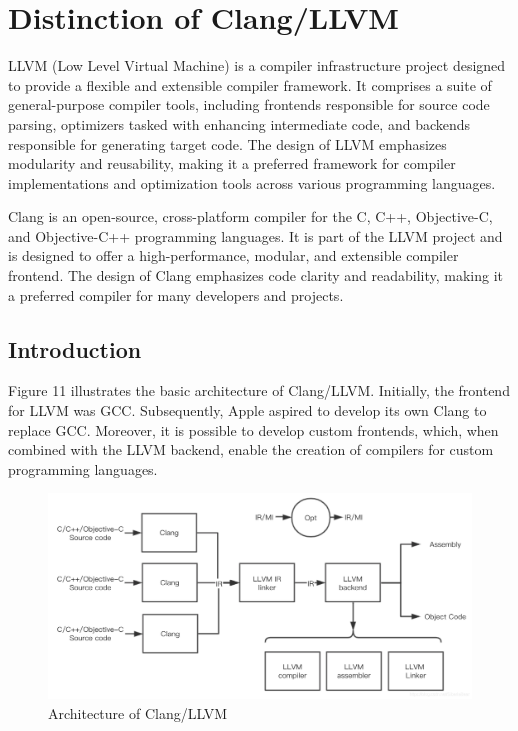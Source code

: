 \documentclass[conference]{IEEEtran}
\begin{document}
\section{Distinction of Clang/LLVM}

LLVM (Low Level Virtual Machine) is a compiler infrastructure project designed to provide a flexible and extensible compiler framework. It comprises a suite of general-purpose compiler tools, including frontends responsible for source code parsing, optimizers tasked with enhancing intermediate code, and backends responsible for generating target code. The design of LLVM emphasizes modularity and reusability, making it a preferred framework for compiler implementations and optimization tools across various programming languages.

Clang is an open-source, cross-platform compiler for the C, C++, Objective-C, and Objective-C++ programming languages. It is part of the LLVM project and is designed to offer a high-performance, modular, and extensible compiler frontend. The design of Clang emphasizes code clarity and readability, making it a preferred compiler for many developers and projects.

\subsection{Introduction}

Figure 11 illustrates the basic architecture of Clang/LLVM. Initially, the frontend for LLVM was GCC. Subsequently, Apple aspired to develop its own Clang to replace GCC. Moreover, it is possible to develop custom frontends, which, when combined with the LLVM backend, enable the creation of compilers for custom programming languages.

\begin{figure}[htbp]
\centering
\includegraphics [width=1\linewidth]{pictures/ClangLLVMoverview.png}
\caption{Architecture of Clang/LLVM\cite{b8}}
\label{fig11}
\end{figure}
\end{document}
